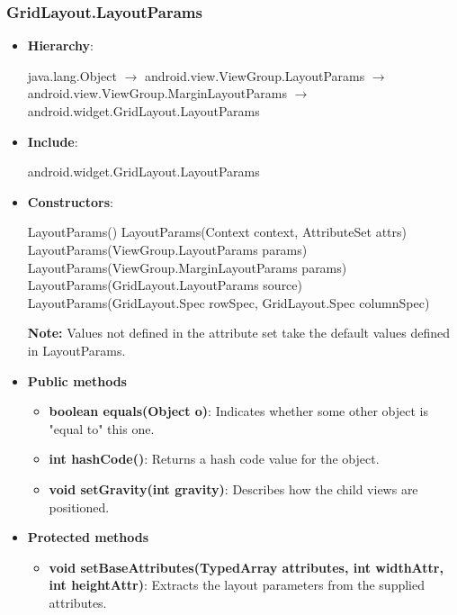 \documentclass{report}
\begin{document}
    \pagebreak 
    \subsubsection{GridLayout.LayoutParams}
    \begin{itemize}
        \item \textbf{Hierarchy}: 
            \begin{center}
                java.lang.Object $\to $	android.view.ViewGroup.LayoutParams $\to $	android.view.ViewGroup.MarginLayoutParams $\to$	android.widget.GridLayout.LayoutParams
            \end{center}
        \item \textbf{Include}:
            \bigbreak \noindent 
            \begin{javacode}
                android.widget.GridLayout.LayoutParams
            \end{javacode}
        \item \textbf{Constructors}:
            \bigbreak \noindent 
            \begin{javacode}
                LayoutParams()
                LayoutParams(Context context, AttributeSet attrs)
                LayoutParams(ViewGroup.LayoutParams params)
                LayoutParams(ViewGroup.MarginLayoutParams params)
                LayoutParams(GridLayout.LayoutParams source)
                LayoutParams(GridLayout.Spec rowSpec, GridLayout.Spec columnSpec)
            \end{javacode}
            \bigbreak \noindent 
            \textbf{Note:} Values not defined in the attribute set take the default values defined in LayoutParams.
        \item \textbf{Public methods}
            \begin{itemize}
                \item \textbf{boolean equals(Object o)}: Indicates whether some other object is "equal to" this one.
                \item \textbf{int hashCode()}: Returns a hash code value for the object.
                \item \textbf{void setGravity(int gravity)}: Describes how the child views are positioned.
            \end{itemize}
        \item \textbf{Protected methods}
            \begin{itemize}
                \item \textbf{void setBaseAttributes(TypedArray attributes, int widthAttr, int heightAttr)}: Extracts the layout parameters from the supplied attributes.

\end{itemize}
\end{itemize}
\end{document}
